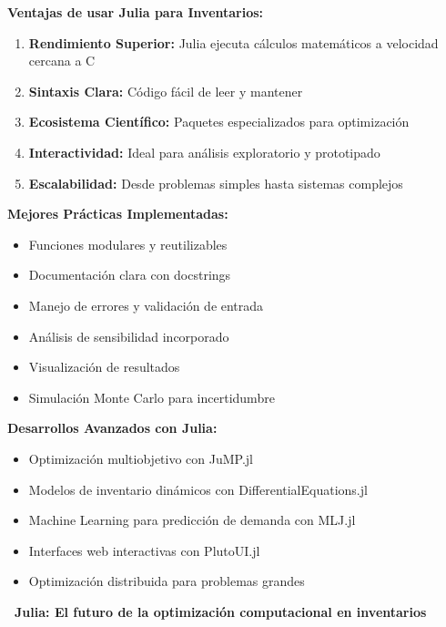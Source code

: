 \documentclass[12pt,a4paper]{book}
\begin{document}
	\begin{tcolorbox}[enhanced,colback=grisclaro,colframe=grisoScuro,boxrule=3pt,arc=15pt,
		drop shadow,title={\Large\bfseries\color{white} \faFlag\ S\'INTESIS Y RECOMENDACIONES}]
		
		\textbf{Ventajas de usar Julia para Inventarios:}
		
		\begin{enumerate}[leftmargin=*,label=\textcolor{azulprincipal}{\arabic*.}]
			\item \textbf{Rendimiento Superior:} Julia ejecuta c\'alculos matem\'aticos a velocidad cercana a C
			\item \textbf{Sintaxis Clara:} C\'odigo f\'acil de leer y mantener
			\item \textbf{Ecosistema Cient\'ifico:} Paquetes especializados para optimizaci\'on
			\item \textbf{Interactividad:} Ideal para an\'alisis exploratorio y prototipado
			\item \textbf{Escalabilidad:} Desde problemas simples hasta sistemas complejos
		\end{enumerate}
		
		\textbf{Mejores Pr\'acticas Implementadas:}
		
		\begin{itemize}[leftmargin=*,label=\textcolor{verdeprincipal}{\faCheck}]
			\item Funciones modulares y reutilizables
			\item Documentaci\'on clara con docstrings
			\item Manejo de errores y validaci\'on de entrada
			\item An\'alisis de sensibilidad incorporado
			\item Visualizaci\'on de resultados
			\item Simulaci\'on Monte Carlo para incertidumbre
		\end{itemize}
		
	\end{tcolorbox}
	
	\begin{tcolorbox}[enhanced,colback=naranjaclaro,colframe=naranjaacento,boxrule=3pt,arc=12pt,
		drop shadow,title={\Large\bfseries\color{white} \faGlobe\ EXTENSIONES FUTURAS}]
		
		\textbf{Desarrollos Avanzados con Julia:}
		\begin{itemize}[leftmargin=*,label=\textcolor{azulprincipal}{\faArrowRight}]
			\item Optimizaci\'on multiobjetivo con JuMP.jl
			\item Modelos de inventario din\'amicos con DifferentialEquations.jl
			\item Machine Learning para predicci\'on de demanda con MLJ.jl
			\item Interfaces web interactivas con PlutoUI.jl
			\item Optimizaci\'on distribuida para problemas grandes
		\end{itemize}
		
	\end{tcolorbox}
	
	\begin{center}
		\begin{tcolorbox}[enhanced,colback=juliacolor,colframe=white,boxrule=2pt,arc=10pt,
			width=0.8\textwidth,center]
			\centering
			{\Large\bfseries\color{white} \faTrophy\ Julia: El futuro de la optimizaci\'on computacional en inventarios}
		\end{tcolorbox}
	\end{center}
	
\end{document}
